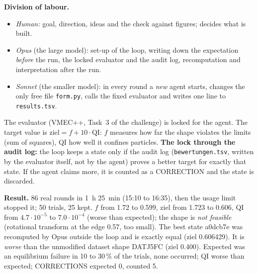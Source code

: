 \textbf{Division of labour.}
\begin{itemize}\itemsep1pt
\item \emph{Human:} goal, direction, ideas and the check against figures; decides what is built.
\item \emph{Opus} (the large model): set-up of the loop, writing down the expectation \emph{before} the run, the locked evaluator and the audit log, recomputation and interpretation after the run.
\item \emph{Sonnet} (the smaller model): in every round a \emph{new} agent starts, changes the only free file \texttt{form.py}, calls the fixed evaluator and writes one line to \texttt{results.tsv}.
\end{itemize}
The evaluator (VMEC++, Task~3 of the challenge) is locked for the agent. The target value is $\text{ziel}=f+10\cdot\mathrm{QI}$: $f$ measures how far the shape violates the limits (sum of squares), QI how well it confines particles. \textbf{The lock through the audit log:} the loop keeps a state only if the audit log
(\texttt{bewertungen.tsv}, written by the evaluator itself, not by the agent) proves a better target for exactly that state. If the agent claims more, it is counted as a CORRECTION and the state is discarded.

\textbf{Result.} 86 real rounds in 1~h 25~min (15:10 to 16:35), then the usage limit stopped it; 50 trials, 25 kept. $f$ from 1.72 to 0.599, ziel from 1.723 to 0.606, QI from $4.7\cdot10^{-5}$ to $7.0\cdot10^{-4}$ (worse than expected); the shape is \emph{not feasible} (rotational transform at the edge 0.57, too small). The best state
a0dcb7e was recomputed by Opus outside the loop and is exactly equal (ziel 0.606429). It is \emph{worse} than the unmodified dataset shape DATJ5FC (ziel 0.400). Expected was an equilibrium failure in 10 to 30\,\% of the trials, none occurred; QI worse than expected; CORRECTIONS expected 0, counted 5.

